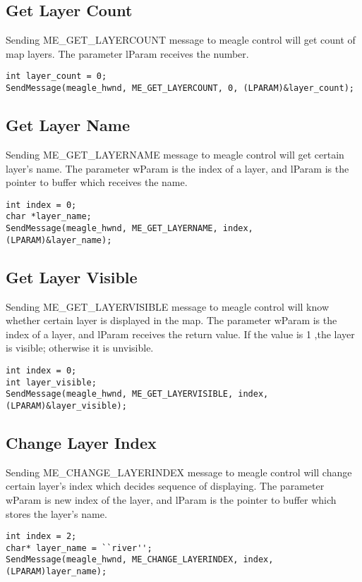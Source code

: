 \documentclass[a4paper]{article}
\begin{document}
\subsection{Get Layer Count}
Sending ME\_GET\_LAYERCOUNT message to meagle control will get count of map layers. The parameter lParam receives the number.
\begin{lstlisting}
int layer_count = 0;
SendMessage(meagle_hwnd, ME_GET_LAYERCOUNT, 0, (LPARAM)&layer_count);
\end{lstlisting}

\subsection{Get Layer Name}
Sending ME\_GET\_LAYERNAME message to meagle control will get certain layer's name.  The parameter wParam is the index of a layer,  and lParam is the pointer to buffer which receives the name. 
\begin{lstlisting}
int index = 0;
char *layer_name;
SendMessage(meagle_hwnd, ME_GET_LAYERNAME, index, (LPARAM)&layer_name);
\end{lstlisting}

\subsection{Get Layer Visible}
Sending ME\_GET\_LAYERVISIBLE message to meagle control will know  whether certain layer is displayed in the map. The parameter wParam is the index of a layer,  and lParam receives the return value. If the value is 1 ,the layer is visible; otherwise it is unvisible.
\begin{lstlisting}
int index = 0;
int layer_visible;
SendMessage(meagle_hwnd, ME_GET_LAYERVISIBLE, index, (LPARAM)&layer_visible);
\end{lstlisting}

\subsection{Change Layer Index}
Sending ME\_CHANGE\_LAYERINDEX message to meagle control will change certain layer's index which decides sequence of displaying. The parameter wParam is new index of the layer, and lParam is the pointer to buffer which stores the layer's name.
\begin{lstlisting}
int index = 2;
char* layer_name = ``river'';
SendMessage(meagle_hwnd, ME_CHANGE_LAYERINDEX, index, (LPARAM)layer_name);
\end{lstlisting}
\end{document}
